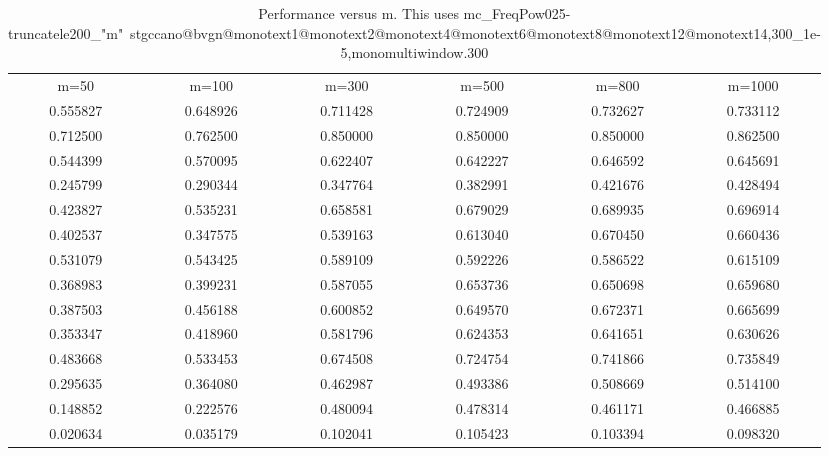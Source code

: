 \documentclass[11pt]{article}
\begin{document}
\begin{table*}[htbp]
  \centering
  \begin{tabular}{cccccc}
    m=50 & m=100 &  m=300 &  m=500 &  m=800 &  m=1000 \\
0.555827 & 0.648926 & 0.711428 & 0.724909 & 0.732627 & 0.733112 \\
0.712500 & 0.762500 & 0.850000 & 0.850000 & 0.850000 & 0.862500 \\
0.544399 & 0.570095 & 0.622407 & 0.642227 & 0.646592 & 0.645691 \\
0.245799 & 0.290344 & 0.347764 & 0.382991 & 0.421676 & 0.428494 \\
0.423827 & 0.535231 & 0.658581 & 0.679029 & 0.689935 & 0.696914 \\
0.402537 & 0.347575 & 0.539163 & 0.613040 & 0.670450 & 0.660436 \\
0.531079 & 0.543425 & 0.589109 & 0.592226 & 0.586522 & 0.615109 \\
0.368983 & 0.399231 & 0.587055 & 0.653736 & 0.650698 & 0.659680 \\
0.387503 & 0.456188 & 0.600852 & 0.649570 & 0.672371 & 0.665699 \\
0.353347 & 0.418960 & 0.581796 & 0.624353 & 0.641651 & 0.630626 \\
0.483668 & 0.533453 & 0.674508 & 0.724754 & 0.741866 & 0.735849 \\
0.295635 & 0.364080 & 0.462987 & 0.493386 & 0.508669 & 0.514100 \\
0.148852 & 0.222576 & 0.480094 & 0.478314 & 0.461171 & 0.466885 \\
0.020634 & 0.035179 & 0.102041 & 0.105423 & 0.103394 & 0.098320 \\
  \end{tabular} 
  \caption{Performance versus m. This uses mc\_FreqPow025-truncatele200\_"m"~stgccano@bvgn@monotext1@monotext2@monotext4@monotext6@monotext8@monotext12@monotext14,300\_1e-5,monomultiwindow.300}
  \label{tab:m}
\end{table*}
\end{document}
